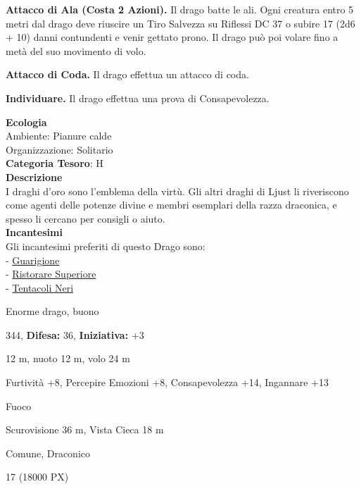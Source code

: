 \begin{multicols}{2}
{\textbf{Attacco di Ala (Costa 2 Azioni).} Il drago batte le ali. Ogni creatura entro 5 metri dal drago deve riuscire un Tiro Salvezza su Riflessi DC 37 o subire 17 (2d6 + 10) danni contundenti e venir gettato prono. Il drago può poi volare fino a metà del suo movimento di volo.

\textbf{Attacco di Coda.} Il drago effettua un attacco di coda.

\textbf{Individuare.} Il drago effettua una prova di Consapevolezza.

\textbf{Ecologia}\\
Ambiente: Pianure calde\\
Organizzazione: Solitario\\
\textbf{Categoria Tesoro}: H\\
\textbf{Descrizione}\\
I draghi d'oro sono l'emblema della virtù. Gli altri draghi di Ljust li riveriscono come agenti delle potenze divine e membri esemplari della razza draconica, e spesso li cercano per consigli o aiuto.\\
\textbf{Incantesimi}\\
Gli incantesimi preferiti di questo Drago sono:\\
- \hyperlink{Guarigione}{Guarigione}\\
- \hyperlink{Ristorare Superiore}{Ristorare Superiore}\\
- \hyperlink{Tentacoli Neri}{Tentacoli Neri}

\noindent
\begin{description}[noitemsep, topsep=0pt, parsep=0pt, partopsep=0pt, leftmargin=0cm, labelwidth=2.2cm]
	\item[\textbf{Taglia/Tipo:}] Enorme drago, buono
	\item[\textbf{Caratt.:}] 
	\item[\textbf{Punti Ferita:}] 344,  \textbf{Difesa:} 36,  \textbf{Iniziativa:} +3
	\item[\textbf{Movimento:}] 12 m, nuoto 12 m, volo 24 m
	\item[\textbf{Tiri Salvez.:}] 
	\item[\textbf{Comp.:}] Furtività +8, Percepire Emozioni +8, Consapevolezza +14, Ingannare +13
	\item[\textbf{Imm. Danni:}] Fuoco
	\item[\textbf{Sensi:}] Scurovisione 36 m, Vista Cieca 18 m
	\item[\textbf{Linguaggi:}] Comune, Draconico
	\item[\textbf{Sfida:}] 17 (18000 PX)\smallskip
\end{description}

}
\end{multicols}
